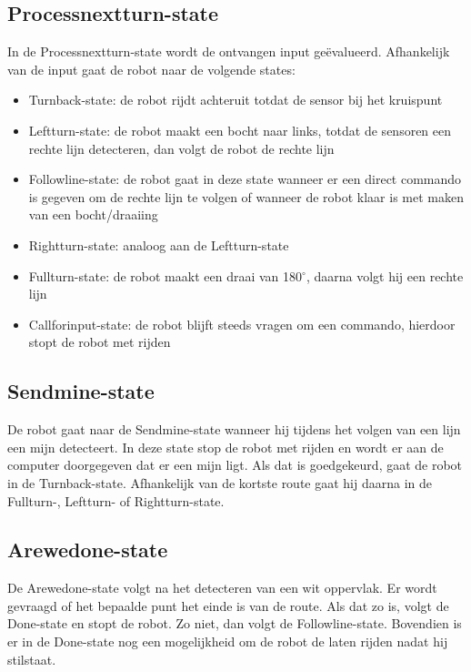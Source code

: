 \documentclass{report}
\begin{document}
\subsection{Processnextturn-state}
In de Processnextturn-state wordt de ontvangen input geëvalueerd.
Afhankelijk van de input gaat de robot naar de volgende states:
\begin{itemize}
\item Turnback-state: de robot rijdt achteruit totdat de sensor bij het kruispunt
\item Leftturn-state: de robot maakt een bocht naar links, totdat de sensoren een rechte lijn detecteren, dan volgt de robot de rechte lijn
\item Followline-state: de robot gaat in deze state wanneer er een direct commando is gegeven om de rechte lijn te volgen of wanneer de robot klaar is met maken van een bocht/draaiing
\item Rightturn-state: analoog aan de Leftturn-state
\item Fullturn-state: de robot maakt een draai van 180$^\circ$, daarna volgt hij een rechte lijn
\item Callforinput-state: de robot blijft steeds vragen om een commando, hierdoor stopt de robot met rijden
\end{itemize} 

\subsection{Sendmine-state}
De robot gaat naar de Sendmine-state wanneer hij tijdens het volgen van een lijn een mijn detecteert.
In deze state stop de robot met rijden en wordt er aan de computer doorgegeven dat er een mijn ligt.
Als dat is goedgekeurd, gaat de robot in de Turnback-state. Afhankelijk van de kortste route gaat hij daarna in de Fullturn-, Leftturn- of Rightturn-state. 

\subsection{Arewedone-state}
De Arewedone-state volgt na het detecteren van een wit oppervlak.
Er wordt gevraagd of het bepaalde punt het einde is van de route.
Als dat zo is, volgt de Done-state en stopt de robot.
Zo niet, dan volgt de Followline-state.
Bovendien is er in de Done-state nog een mogelijkheid om de robot de laten rijden nadat hij stilstaat.
\end{document}
